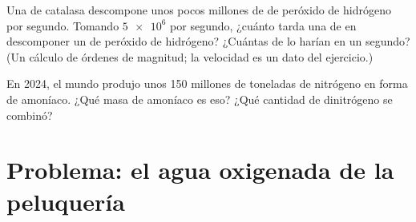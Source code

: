 \begin{exercise}[$\star\star\star$]\label{exo:g12:catalysis:14}
Una  de catalasa descompone unos pocos millones de  de
peróxido de hidrógeno por segundo. Tomando $\num{5e6}$ por segundo,
¿cuánto tarda una  de  en descomponer un  de peróxido de
hidrógeno? ¿Cuántas  de  lo harían en un segundo? (Un
cálculo de órdenes de magnitud; la velocidad es un dato del ejercicio.)
\end{exercise}

\begin{exercise}[$\star\star\star$]\label{exo:g12:catalysis:15}
En 2024, el mundo produjo unos 150 millones de toneladas de nitrógeno en
forma de amoníaco. ¿Qué masa de amoníaco es eso? ¿Qué cantidad de
dinitrógeno se combinó?
\end{exercise}

\section{Problema: el agua oxigenada de la peluquería}


